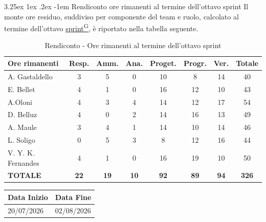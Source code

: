 \documentclass[a4paper,12pt]{article}
\makeatletter
\newcounter{subsubsubsection}[subsubsection]
\renewcommand\paragraph{\@startsection{paragraph}{5}{\z@}%
  {3.25ex \@plus1ex \@minus.2ex}%
  {-1em}%
  {\normalfont\normalsize\bfseries}}
\providecommand{\glslink}[2]{\href{https://alittlebyte-19.github.io/Documentazione/glossario.html\#gls-#1}{\underline{#2}\textsuperscript{\scriptsize G}}}
\makeatother
\begin{document}
\paragraph{Rendiconto ore rimanenti al termine dell'ottavo sprint}
Il monte ore residuo, suddiviso per componente del team e ruolo, calcolato al termine dell'ottavo \glslink{sprint}{sprint}, è riportato nella tabella seguente.
\begin{table}[htbp]
\centering
\renewcommand{\arraystretch}{1.5}
\begin{tabularx}{\textwidth}{|X|c|c|c|c|c|c|c|}
\hline
\textbf{Ore rimanenti} & \textbf{Resp.} & \textbf{Amm.} & \textbf{Ana.} & \textbf{Proget.} & \textbf{Progr.} & \textbf{Ver.} & \textbf{Totale} \\
\hline
A. Gastaldello & 3 & 5 & 0 & 10 & 8 & 14 & 40 \\
\hline
E. Bellet & 4 & 1 & 0 & 16 & 12 & 10 & 43 \\
\hline
A.Oloni & 4 & 3 & 4 & 14 & 12 & 17 & 54 \\
\hline
D. Belluz & 4 & 0 & 2 & 14 & 16 & 13 & 49 \\
\hline
A. Maule & 3 & 4 & 1 & 14 & 10 & 14 & 46 \\
\hline
L. Soligo & 0 & 5 & 3 & 8 & 12 & 16 & 44 \\
\hline
V. Y. K. Fernandes & 4 & 1 & 0 & 16 & 19 & 10 & 50 \\
\hline
\rowcolor{gray!20}
\textbf{TOTALE} & \textbf{22} & \textbf{19} & \textbf{10} & \textbf{92} & \textbf{89} & \textbf{94} & \textbf{326} \\
\hline
\end{tabularx}
\caption{Rendiconto - Ore rimanenti al termine dell'ottavo sprint}
\end{table}


\newpage


\label{sec:pb_nonoperiodo}
\begin{table}[H]
    \centering
    \renewcommand{\arraystretch}{1.5}
    \begin{tabularx}{\textwidth}{|X|X|}
    \hline \rowcolor{Dandelion!50}
    \textbf{Data Inizio} & \textbf{Data Fine}\\
    \hline
    20/07/2026 & 02/08/2026\\
    \hline

    \end{tabularx}
\end{table}
\end{document}
